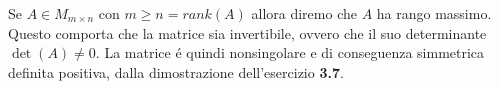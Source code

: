 Se $A \in M_{m \times n}$ con $m \geq n = rank(A)$ allora diremo che $A$ ha rango massimo.
\\
Questo comporta che la matrice sia invertibile, ovvero che il suo determinante $\det(A) \neq 0$. La matrice \'e quindi nonsingolare e di conseguenza simmetrica definita positiva, dalla dimostrazione dell'esercizio \textbf{3.7}.
